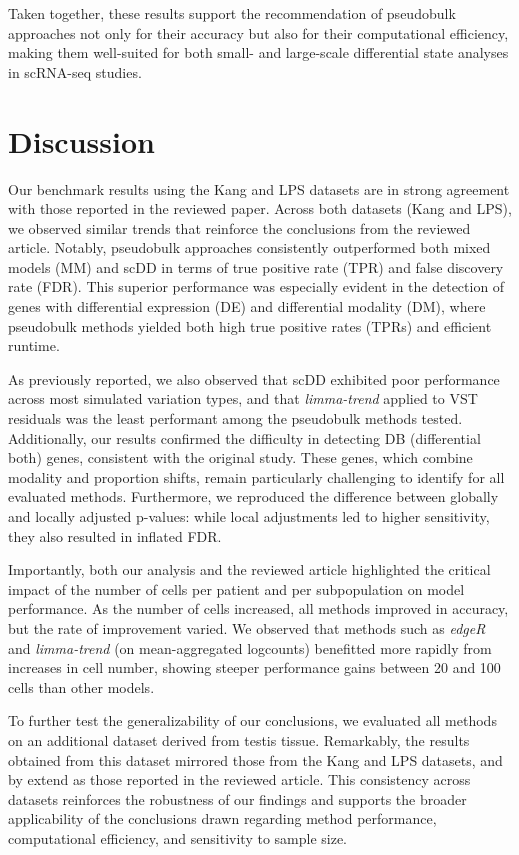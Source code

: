 \documentclass[a4paper, 11pt, twocolumn]{article}
\begin{document}
\begin{multicols}{2}
Taken together, these results support the recommendation of pseudobulk approaches not only for their accuracy but also for their computational efficiency, making them well-suited for both small- and large-scale differential state analyses in scRNA-seq studies.

\section{Discussion}

Our benchmark results using the Kang and LPS datasets are in strong agreement with those reported in the reviewed paper. Across both datasets (Kang and LPS), we observed similar trends that reinforce the conclusions from the reviewed article. Notably, pseudobulk approaches consistently outperformed both mixed models (MM) and scDD in terms of true positive rate (TPR) and false discovery rate (FDR). This superior performance was especially evident in the detection of genes with differential expression (DE) and differential modality (DM), where pseudobulk methods yielded both high true positive rates (TPRs) and efficient runtime.

As previously reported, we also observed that scDD exhibited poor performance across most simulated variation types, and that \textit{limma-trend} applied to VST residuals was the least performant among the pseudobulk methods tested. Additionally, our results confirmed the difficulty in detecting DB (differential both) genes, consistent with the original study. These genes, which combine modality and proportion shifts, remain particularly challenging to identify for all evaluated methods. Furthermore, we reproduced the difference between globally and locally adjusted p-values: while local adjustments led to higher sensitivity, they also resulted in inflated FDR.

Importantly, both our analysis and the reviewed article highlighted the critical impact of the number of cells per patient and per subpopulation on model performance. As the number of cells increased, all methods improved in accuracy, but the rate of improvement varied. We observed that methods such as \textit{edgeR} and \textit{limma-trend} (on mean-aggregated logcounts) benefitted more rapidly from increases in cell number, showing steeper performance gains between 20 and 100 cells than other models.

To further test the generalizability of our conclusions, we evaluated all methods on an additional dataset derived from testis tissue. Remarkably, the results obtained from this dataset mirrored those from the Kang and LPS datasets, and by extend as those reported in the reviewed article. This consistency across datasets reinforces the robustness of our findings and supports the broader applicability of the conclusions drawn regarding method performance, computational efficiency, and sensitivity to sample size.


\end{multicols}
\end{document}
